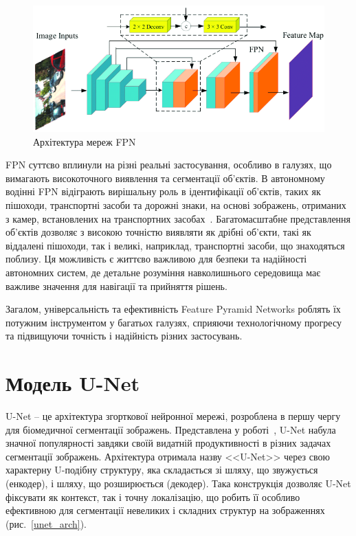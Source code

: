 \begin{figure}[ht]
    \centering
    \includegraphics[scale=0.5]{Images/fpn_arch.png}
    \caption{Архітектура мереж FPN}
    \label{fpn_arch}
\end{figure}

FPN суттєво вплинули на різні реальні застосування, особливо в галузях, що
вимагають високоточного виявлення та сегментації об'єктів. В автономному
водінні FPN відіграють вирішальну роль в ідентифікації об'єктів, таких як
пішоходи, транспортні засоби та дорожні знаки, на основі зображень, отриманих з
камер, встановлених на транспортних засобах~\cite{liao2021}. Багатомасштабне
представлення об'єктів дозволяє з високою точністю виявляти як дрібні об'єкти,
такі як віддалені пішоходи, так і великі, наприклад, транспортні засоби, що
знаходяться поблизу. Ця можливість є життєво важливою для безпеки та надійності
автономних систем, де детальне розуміння навколишнього середовища має важливе
значення для навігації та прийняття рішень.

Загалом, універсальність та ефективність
Feature Pyramid Networks роблять їх потужним
інструментом у багатьох галузях, сприяючи
технологічному прогресу та підвищуючи точність
і надійність різних застосувань.

\section{Модель U-Net}

U-Net -- це архітектура згорткової нейронної мережі, розроблена в першу чергу
для біомедичної сегментації зображень. Представлена у
роботі~\cite{ronneberger2015}, U-Net набула значної популярності завдяки своїй
видатній продуктивності в різних задачах сегментації зображень. Архітектура
отримала назву <<U-Net>> через свою характерну U-подібну структуру, яка
складається зі шляху, що звужується (енкодер), і шляху, що розширюється
(декодер). Така конструкція дозволяє U-Net фіксувати як контекст, так і точну
локалізацію, що робить її особливо ефективною для сегментації невеликих і
складних структур на зображеннях (рис.~\ref{unet_arch}).

